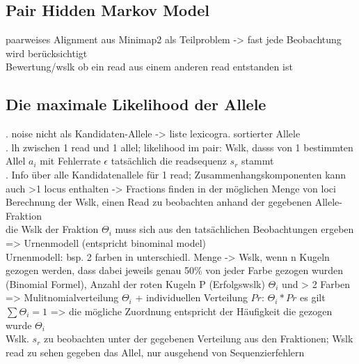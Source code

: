 \subsection{Pair Hidden Markov Model} \label{subsec:sol_phmm}
paarweises Alignment aus Minimap2 als Teilproblem -> fast jede Beobachtung wird berücksichtigt\\
Bewertung/wslk ob ein read aus einem anderen read entstanden ist\\
\subsection{Die maximale Likelihood der Allele} \label{subsec:sol_allele_lh}
. noise nicht als Kandidaten-Allele -> liste lexicogra. sortierter Allele\\

. lh zwischen 1 read und 1 allel; likelihood im pair: Wslk, dasss von 1 bestimmten Allel $a_{i}$ mit Fehlerrate $\epsilon$ tatsächlich die readsequenz $s_{r}$ stammt \\

. Info über alle Kandidatenallele für 1 read; Zusammenhangskomponenten kann auch >1 locus enthalten -> Fractions finden in der möglichen Menge von loci \\
Berechnung der Wslk, einen Read zu beobachten anhand der gegebenen Allele-Fraktion\\
die Wslk der Fraktion $\Theta_{i}$ muss sich aus den tatsächlichen Beobachtungen ergeben => Urnenmodell (entspricht binominal model)\\
Urnenmodell: bsp. 2 farben in unterschiedl. Menge -> Wslk, wenn n Kugeln gezogen werden, dass dabei jeweils genau 50\% von jeder Farbe gezogen wurden (Binomial Formel), Anzahl der roten Kugeln P (Erfolgswslk) $\Theta_{i}$ und  > 2 Farben => Mulitnomialverteilung $\Theta_{i}$ + individuellen Verteilung $Pr$: $\Theta_{i} * Pr$
es gilt $\sum \Theta_{i} = 1$ => die mögliche Zuordnung entspricht der Häufigkeit die gezogen wurde $\Theta_{i}$ \\
Wslk. $ s_{r} $ zu beobachten unter der gegebenen Verteilung aus den Fraktionen; Wslk read zu sehen gegeben das Allel, nur ausgehend von Sequenzierfehlern \\

